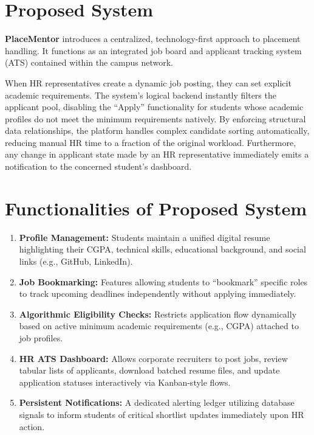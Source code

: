 \documentclass[a4paper,12pt]{report}
\begin{document}
\section{Proposed System}

\textbf{PlaceMentor} introduces a centralized, technology-first approach to placement handling. It functions as an integrated job board and applicant tracking system (ATS) contained within the campus network. 

When HR representatives create a dynamic job posting, they can set explicit academic requirements. The system's logical backend instantly filters the applicant pool, disabling the ``Apply'' functionality for students whose academic profiles do not meet the minimum requirements natively. By enforcing structural data relationships, the platform handles complex candidate sorting automatically, reducing manual HR time to a fraction of the original workload. Furthermore, any change in applicant state made by an HR representative immediately emits a notification to the concerned student's dashboard.

\section{Functionalities of Proposed System}

\begin{enumerate}
    \item \textbf{Profile Management:} Students maintain a unified digital resume highlighting their CGPA, technical skills, educational background, and social links (e.g., GitHub, LinkedIn).
    \item \textbf{Job Bookmarking:} Features allowing students to ``bookmark'' specific roles to track upcoming deadlines independently without applying immediately.
    \item \textbf{Algorithmic Eligibility Checks:} Restricts application flow dynamically based on active minimum academic requirements (e.g., CGPA) attached to job profiles.
    \item \textbf{HR ATS Dashboard:} Allows corporate recruiters to post jobs, review tabular lists of applicants, download batched resume files, and update application statuses interactively via Kanban-style flows.
    \item \textbf{Persistent Notifications:} A dedicated alerting ledger utilizing database signals to inform students of critical shortlist updates immediately upon HR action.
\end{enumerate}
\end{document}
